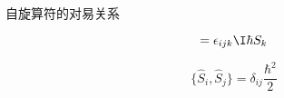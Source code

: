 \begin{theorem}{自旋算符的对易关系}\label{the_ComOpQ_8}



\begin{equation}
[\hat{S}_i, \hat{S}_j]=\epsilon_{ijk}\I\hbar S_k
\end{equation}

\begin{equation}
\{\hat{S}_i, \hat{S}_j\}=\delta_{ij}\frac{\hbar^2}{2}
\end{equation}


\end{theorem}






